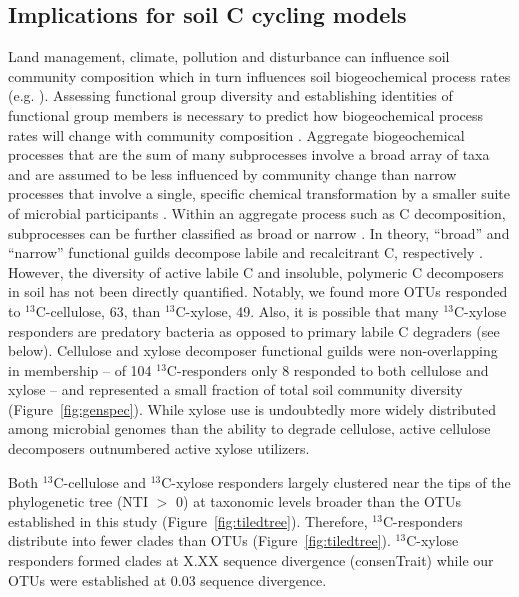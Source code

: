 \subsection{Implications for soil C cycling models}
Land management, climate, pollution and disturbance can influence soil
community composition \citep{McGuire2010} which in turn influences soil
biogeochemical process rates (e.g. \citep{Berlemont2014a}). Assessing
functional group diversity and establishing identities of functional group
members is necessary to predict how biogeochemical process rates will change
with community composition \citep{Schimel_1995,McGuire2010}. Aggregate
biogeochemical processes that are the sum of many subprocesses involve a broad
array of taxa and are assumed to be less influenced by community change than
narrow processes that involve a single, specific chemical transformation by
a smaller suite of microbial participants \citep{Schimel_1995,McGuire2010}.
Within an aggregate process such as C decomposition, subprocesses can be
further classified as broad or narrow \citep{McGuire2010}. In theory,
``broad'' and ``narrow'' functional guilds decompose labile and
recalcitrant C, respectively \citep{McGuire2010}. However, the diversity
of active labile C and insoluble, polymeric C decomposers in soil has not
been directly quantified. Notably, we found more OTUs responded to
$^{13}$C-cellulose, 63, than $^{13}$C-xylose, 49. Also, it is possible
that many $^{13}$C-xylose responders are predatory bacteria as opposed to
primary labile C degraders (see below). Cellulose and xylose decomposer
functional guilds were non-overlapping in membership -- of
104 $^{13}$C-responders only 8 responded to both cellulose and xylose -- and
represented a small fraction of total soil community diversity
(Figure~\ref{fig:genspec}). While xylose use is undoubtedly more widely
distributed among microbial genomes than the ability to degrade cellulose,
active cellulose decomposers outnumbered active xylose utilizers.

Both $^{13}$C-cellulose and $^{13}$C-xylose responders largely clustered
near the tips of the phylogenetic tree (NTI $>$ 0) at taxonomic levels broader
than the OTUs established in this study (Figure~\ref{fig:tiledtree}).
Therefore, $^{13}$C-responders distribute into fewer clades than OTUs
(Figure~\ref{fig:tiledtree}). $^{13}$C-xylose responders formed clades at
X.XX sequence divergence (consenTrait) while our OTUs were
established at 0.03 sequence divergence. 

